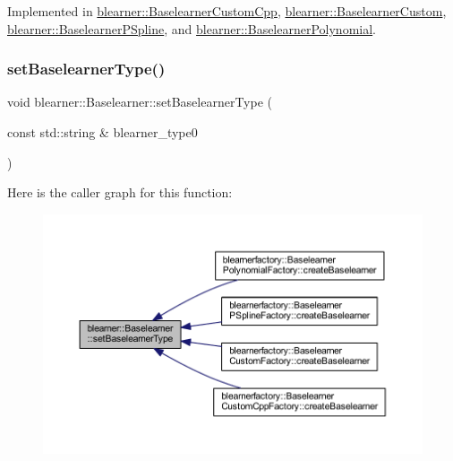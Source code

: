 Implemented in \mbox{\hyperlink{classblearner_1_1_baselearner_custom_cpp_a55fb45a929fea01f79fa3dcad7698174}{blearner\+::\+Baselearner\+Custom\+Cpp}}, \mbox{\hyperlink{classblearner_1_1_baselearner_custom_aeeb3a3934b94f095bfe689cff385dfa7}{blearner\+::\+Baselearner\+Custom}}, \mbox{\hyperlink{classblearner_1_1_baselearner_p_spline_a241485cc3e932c45564370a0881e3772}{blearner\+::\+Baselearner\+P\+Spline}}, and \mbox{\hyperlink{classblearner_1_1_baselearner_polynomial_a8aee40269b2b4dabdd81cebe5b4f2488}{blearner\+::\+Baselearner\+Polynomial}}.

\mbox{\label{classblearner_1_1_baselearner_a8d78e851bae5f5b93dc46eb13d2d1ee1}} 
\subsubsection{\texorpdfstring{set\+Baselearner\+Type()}{setBaselearnerType()}}
{\footnotesize\ttfamily void blearner\+::\+Baselearner\+::set\+Baselearner\+Type (\begin{DoxyParamCaption}\item[{const std\+::string \&}]{blearner\+\_\+type0 }\end{DoxyParamCaption})}

Here is the caller graph for this function\+:\nopagebreak
\begin{figure}[H]
\begin{center}
\leavevmode
\includegraphics[width=350pt]{classblearner_1_1_baselearner_a8d78e851bae5f5b93dc46eb13d2d1ee1_icgraph}
\end{center}
\end{figure}
\mbox{\label{classblearner_1_1_baselearner_a29122c6125ef6ec03ad84602b3e2d0d4}} 
